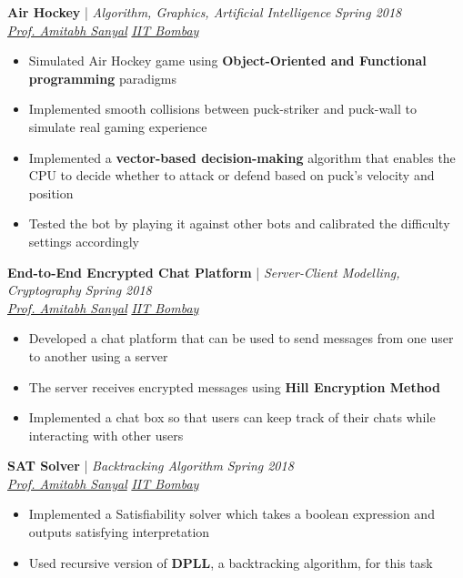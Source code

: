 \documentclass[11pt]{article}
\begin{document}
\textbf{Air Hockey} | {\it Algorithm, Graphics, Artificial Intelligence}  \hfill{\sl \small Spring 2018}\\
{\it \href{https://www.cse.iitb.ac.in/~as/}{Prof. Amitabh Sanyal} }\hfill{\sl \small \href{http://www.iitb.ac.in/}{IIT Bombay}}
\vspace{-4pt}
\begin{itemize}[itemsep = -0.75 mm, leftmargin=*]
\vspace{-1pt}
\item Simulated Air Hockey game using {\bf Object-Oriented and Functional programming} paradigms
\item Implemented smooth collisions between puck-striker and puck-wall to simulate real gaming experience
\item Implemented a {\bf vector-based decision-making} algorithm that enables the CPU to decide whether to attack or defend based on puck's velocity and position
\item Tested the bot by playing it against other bots and calibrated the difficulty settings accordingly
\end{itemize}
\vspace*{-1mm}
\textbf{End-to-End Encrypted Chat Platform} | {\it Server-Client Modelling, Cryptography}  \hfill{\sl \small Spring 2018}\\
{\it \href{https://www.cse.iitb.ac.in/~as/}{Prof. Amitabh Sanyal} }\hfill{\sl \small \href{http://www.iitb.ac.in/}{IIT Bombay}}
\vspace{-4pt}
\begin{itemize}[itemsep = -0.75 mm, leftmargin=*]
\vspace{-1pt}
   \item Developed a chat platform that can be used to send messages from one user to another using a server
   \item The server receives encrypted messages using {\bf Hill Encryption Method} 
   \item  Implemented a chat box so that users can keep track of their chats while interacting with other users
\end{itemize}
\vspace*{-1mm}
\textbf{SAT Solver} | {\it Backtracking Algorithm} \hfill{\sl \small Spring 2018}\\
{\it \href{https://www.cse.iitb.ac.in/~as/}{Prof. Amitabh Sanyal} }\hfill{\sl \small \href{http://www.iitb.ac.in/}{IIT Bombay}}
\vspace{-4pt}
\begin{itemize}[itemsep = -0.75 mm, leftmargin=*]
\vspace{-1pt}
   \item Implemented a Satisfiability solver which takes a boolean expression and outputs satisfying interpretation  
   \item Used recursive version of {\bf DPLL}, a backtracking algorithm, for this task 
\end{itemize}
\end{document}
